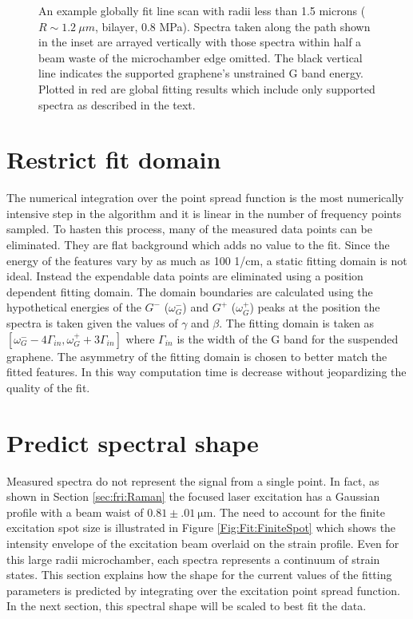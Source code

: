 \begin{figure}
	\begin{center}
	
	\end{center}
	\caption[An example globally fit line scan with radii less than 1.5 microns]{\label{fig:Fit:igouter}
	An example globally fit line scan with radii less than 1.5 microns ($R\sim 1.2 \ \mu m$, bilayer, 0.8 MPa).
	Spectra taken along the path shown in the inset are arrayed vertically with those spectra within half a beam waste of the microchamber edge omitted. 
	The black vertical line indicates the supported graphene's unstrained G band energy.
	Plotted in red are global fitting results which include only supported spectra as described in the text.}
\end{figure}

\section*{Restrict fit domain}
The numerical integration over the point spread function is the most numerically intensive step in the algorithm and it is linear in the number of frequency points sampled.
To hasten this process, many of the measured data points can be eliminated.
They are flat background which adds no value to the fit.
Since the energy of the features vary by as much as 100 1/cm, a static fitting domain is not ideal.
Instead the expendable data points are eliminated using a position dependent fitting domain.
The domain boundaries are calculated using the hypothetical energies of the $G^-$ ($\omega_{G}^-$) and $G^+$ ($\omega_{G}^+$) peaks at the position the spectra is taken given the values of $\gamma$ and $\beta$.
The fitting domain is taken as $[\omega_{G}^- - 4 \Gamma_{in},\omega_{G}^+  +3 \Gamma_{in}]$ where $\Gamma_{in}$ is the width of the G band for the suspended graphene.
The asymmetry of the fitting domain is chosen to better match the fitted features.
In this way computation time is decrease without jeopardizing the quality of the fit.

\section*{Predict spectral shape}
Measured spectra do not represent the signal from a single point.
In fact, as shown in Section \ref{sec:fri:Raman} the focused laser excitation has a Gaussian profile with a beam waist of $0.81 \pm .01 \ \mathrm{\mu m}$.
The need to account for the finite excitation spot size is illustrated in Figure \ref{Fig:Fit:FiniteSpot} which shows the intensity envelope of the excitation beam overlaid on the strain profile.
Even for this large radii microchamber, each spectra represents a continuum of strain states.
This section explains how the shape for the current values of the fitting parameters is predicted by integrating over the excitation point spread function.
In the next section, this spectral shape will be scaled to best fit the data.

